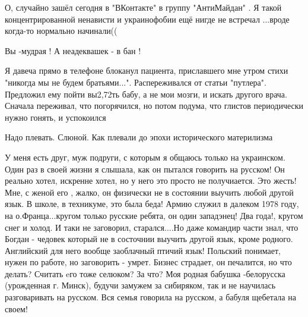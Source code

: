 \begin{itemize}
О, случайно зашёл сегодня в "ВКонтакте" в группу "АнтиМайдан" . Я такой
концентрированной ненависти и украинофобии ещё нигде не встречал ...вроде
когда-то нормально начинали((


 
Вы -мудрая ! А неадеквашек - в бан !

 

Я давеча прямо в телефоне блоканул пациента, приславшего мне утром стихи
"никогда мы не будем братьями...". Распереживался от статьи "путлера".
Предложил ему пойти вы2,72ть бабу, а не мои мозги, и искать другого врача.
Сначала переживал, что погорячился, но потом подума, что глистов периодически
нужно гонять, и успокоился


 
Надо плевать. Слюной. Как плевали до эпохи исторического материлизма

 

У меня есть друг, муж подруги, с которым я общаюсь только на украинском. Один
раз в своей жизни я слышала, как он пытался говорить на русском! Он реально
хотел, искренне хотел, но у него это просто не получиается. Это жесть! Мне, с
женой его , жалко, он физически не в состоянии выучить любой другой язык. В
школе, в техникуме, это была беда! Армию служил в далеком 1978 году, на
о.Франца...кругом только русские ребята, он один западэнец! Два года!, кругом
снег и холод. И таки не заговорил, старался....Но даже командир части знал, что
Богдан - чедовек который не в состочнии выучить другой язык, кроме родного.
Английский для него вообще заоблачный птичий язык! Польский понимает, нужен по
работе, но заговорить - умрет. Бизнес страдает, он печалится, но что делать?
Считать eго тоже селюком? За что? Моя родная бабушка -белорусска (урожденная г.
Минск), будучи замужем за сибиряком, так и не научилась разговаривать на
русском. Вся семья говорила на русском, а бабуля щебетала на своем!


\end{itemize}
